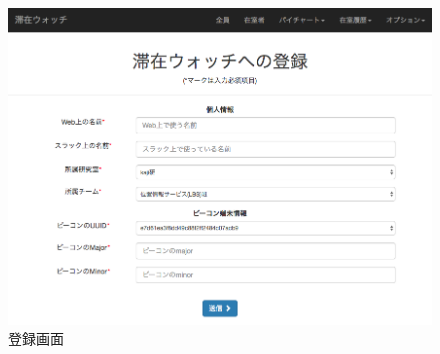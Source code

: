 
\begin{figure}[H]
  \begin{center}
    \includegraphics[width=160mm]{image/RegistrationScreen.png}
    \caption{登録画面}
    \label{fig:ent}
  \end{center}
\end{figure}


